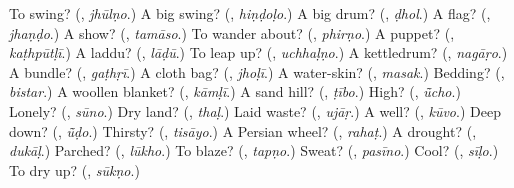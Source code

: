 \begin{tcolorbox}[breakable,colback=teal!4,colframe=teal!35!black,title={Before you move on}]
To swing? (\textbf{}, \emph{jhūlṇo}.) A big swing? (\textbf{}, \emph{hiṇḍoḷo}.) A big drum? (\textbf{}, \emph{ḍhol}.) A flag? (\textbf{}, \emph{jhaṇḍo}.) A show? (\textbf{}, \emph{tamāso}.) To wander about? (\textbf{}, \emph{phirṇo}.) A puppet? (\textbf{}, \emph{kaṭhpūtḷī}.) A laddu? (\textbf{}, \emph{lāḍū}.) To leap up? (\textbf{}, \emph{uchhaḷṇo}.) A kettledrum? (\textbf{}, \emph{nagāṛo}.) A bundle? (\textbf{}, \emph{gaṭhṛī}.) A cloth bag? (\textbf{}, \emph{jhoḷī}.) A water-skin? (\textbf{}, \emph{masak}.) Bedding? (\textbf{}, \emph{bistar}.) A woollen blanket? (\textbf{}, \emph{kāmḷī}.) A sand hill? (\textbf{}, \emph{ṭībo}.) High? (\textbf{}, \emph{ū̃cho}.) Lonely? (\textbf{}, \emph{sūno}.) Dry land? (\textbf{}, \emph{thaḷ}.) Laid waste? (\textbf{}, \emph{ujāṛ}.) A well? (\textbf{}, \emph{kūvo}.) Deep down? (\textbf{}, \emph{ū̃ḍo}.) Thirsty? (\textbf{}, \emph{tisāyo}.) A Persian wheel? (\textbf{}, \emph{rahaṭ}.) A drought? (\textbf{}, \emph{dukāḷ}.) Parched? (\textbf{}, \emph{lūkho}.) To blaze? (\textbf{}, \emph{tapṇo}.) Sweat? (\textbf{}, \emph{pasīno}.) Cool? (\textbf{}, \emph{sīḷo}.) To dry up? (\textbf{}, \emph{sūkṇo}.)
\end{tcolorbox}
